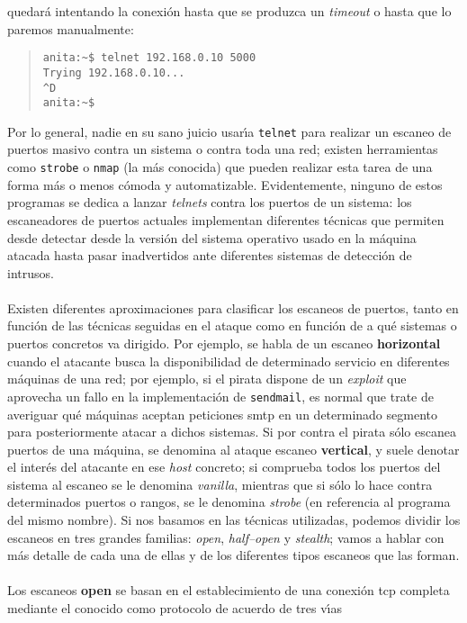 quedar\'a intentando la conexi\'on hasta que se produzca un {\it timeout} o 
hasta que lo paremos manualmente:
\begin{quote}
\begin{verbatim}
anita:~$ telnet 192.168.0.10 5000
Trying 192.168.0.10...
^D
anita:~$ 
\end{verbatim}
\end{quote}
Por lo general, nadie en su sano juicio usar\'{\i}a {\tt telnet} para realizar
un escaneo de puertos masivo contra un sistema o contra toda una red; existen
herramientas como {\tt strobe} o {\tt nmap} (la m\'as conocida) que pueden 
realizar esta tarea de una forma m\'as o menos c\'omoda y automatizable.
Evidentemente, ninguno de estos programas se dedica a lanzar {\it telnets} 
contra los puertos de un sistema: los escaneadores de puertos actuales 
implementan diferentes t\'ecnicas que permiten desde detectar desde la versi\'on
del sistema operativo usado en la m\'aquina atacada hasta pasar inadvertidos 
ante diferentes sistemas de detecci\'on de intrusos.\\
\\Existen diferentes aproximaciones para clasificar los escaneos de puertos,
tanto en funci\'on de las t\'ecnicas seguidas en el ataque como en funci\'on de
a qu\'e sistemas o puertos concretos va dirigido. Por ejemplo, se habla de un 
escaneo {\bf horizontal} cuando el atacante busca la disponibilidad de 
determinado servicio en diferentes 
m\'aquinas de una red; por ejemplo, si el pirata dispone de un {\it exploit} 
que aprovecha un fallo en la implementaci\'on de {\tt sendmail}, es normal que
trate de averiguar qu\'e m\'aquinas aceptan peticiones {\sc smtp} en un
determinado segmento para posteriormente atacar a dichos sistemas. Si por 
contra el pirata s\'olo escanea puertos de una m\'aquina, se denomina al ataque 
escaneo {\bf vertical}, y suele denotar el inter\'es del atacante en ese {\it
host} concreto; si comprueba todos los puertos del sistema al escaneo se le 
denomina {\it vanilla}, mientras que si s\'olo lo hace contra determinados 
puertos o rangos, se le denomina {\it strobe} (en referencia al programa del 
mismo nombre). Si nos basamos en las t\'ecnicas utilizadas, podemos dividir los
escaneos en tres grandes familias: {\it open}, {\it half--open} y {\it stealth};
vamos a hablar con m\'as detalle de cada una de ellas y de los diferentes 
tipos escaneos que las forman.\\
\\Los escaneos {\bf open} se basan en el establecimiento de una conexi\'on {\sc 
tcp} completa mediante el conocido como protocolo de acuerdo de tres v\'{\i}as 
